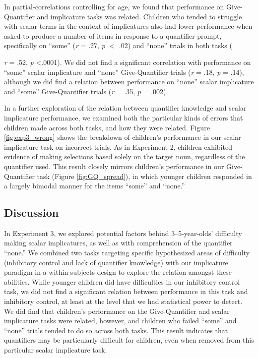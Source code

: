 \documentclass[man]{apa2}
\begin{document}
In partial-correlations controlling for age, we found that performance on Give-Quantifier and implicature tasks was related. Children who tended to struggle with scalar terms in the context of implicatures also had lower performance when asked to produce a number of items in response to a quantifier prompt, specifically on ``some''  (\textit{r} = .27, \textit{p} $<$ .02) and ``none'' trials in both tasks ({\textit{r} = .52, \textit{p} \textless .0001). We did not find a significant correlation with performance on ``some'' scalar implicature and ``none'' Give-Quantifier trials (\textit{r} = .18, \textit{p} = .14), although we did find a relation between performance on ``none'' scalar implicature and ``some'' Give-Quantifier trials (\textit{r} = .35, \textit{p} = .002).

In a further exploration of the relation between quantifier knowledge and scalar implicature performance, we examined both the particular kinds of errors that children made across both tasks, and how they were related. Figure \ref{fig:exp3_wrong} shows the breakdown of children's performance in our scalar implicature task on incorrect trials. As in Experiment 2, children exhibited evidence of making selections based solely on the target noun, regardless of the quantifier used. This result closely mirrors children's performance in our Give-Quantifier task (Figure \ref{fig:GQ_spread}), in which younger children responded in a largely bimodal manner for the items ``some'' and ``none.''

\subsection{Discussion}

In Experiment 3, we explored potential factors behind 3--5-year-olds' difficulty making scalar implicatures, as well as with comprehension of the quantifier ``none.'' We combined two tasks targeting specific hypothesized areas of difficulty (inhibitory control and lack of quantifier knowledge) with our implicature paradigm in a within-subjects design to explore the relation amongst these abilities. While younger children did have difficulties in our inhibitory control task, we did not find a significant relation between performance in this task and inhibitory control, at least at the level that we had statistical power to detect. We did find that children's performance on the Give-Quantifier and scalar implicature tasks were related, however, and children who failed ``some'' and ``none'' trials tended to do so across both tasks. This result indicates that quantifiers may be particularly difficult for children, even when removed from this particular scalar implicature task.

}
\end{document}
